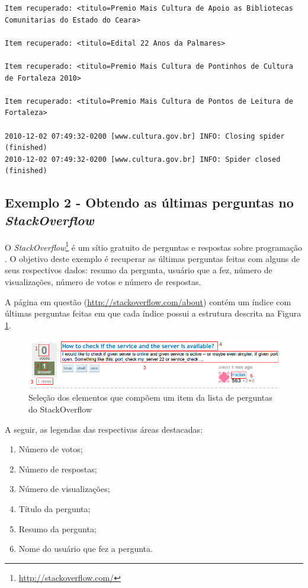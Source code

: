 \begin{lstlisting}[label=scrapy_wpt_minc]
Item recuperado: <titulo=Premio Mais Cultura de Apoio as Bibliotecas Comunitarias do Estado do Ceara> 

Item recuperado: <titulo=Edital 22 Anos da Palmares> 

Item recuperado: <titulo=Premio Mais Cultura de Pontinhos de Cultura de Fortaleza 2010> 

Item recuperado: <titulo=Premio Mais Cultura de Pontos de Leitura de Fortaleza> 

2010-12-02 07:49:32-0200 [www.cultura.gov.br] INFO: Closing spider (finished)
2010-12-02 07:49:32-0200 [www.cultura.gov.br] INFO: Spider closed (finished)
\end{lstlisting}


\subsection{Exemplo 2 - Obtendo as últimas perguntas no \textit{StackOverflow}}

O \textit{StackOverflow}\footnote{\url{http://stackoverflow.com/}} é um sítio gratuito de perguntas e respostas sobre programação \cite{stackoverflow}. O objetivo deste exemplo é recuperar as últimas perguntas feitas com alguns de seus respectivos dados: resumo da pergunta, usuário que a fez, número de visualizações, número de votos e número de respostas.

A página em questão (\url{http://stackoverflow.com/about}) contém um índice com últimas perguntas feitas em que cada índice possui a estrutura descrita na Figura \ref{stackoverflow}.

\begin{figure} [ht]
	\centering
	\includegraphics[scale=0.8]{stackoverflow.png}
	\caption{Seleção dos elementos que compõem um item da lista de perguntas do StackOverflow}
	\label{stackoverflow}
\end{figure}

A seguir, as legendas das respectivas áreas destacadas:

\begin{enumerate}
	\item Número de votos;
	\item Número de respostas;
	\item Número de visualizações;
	\item Título da pergunta;
	\item Resumo da pergunta;
	\item Nome do usuário que fez a pergunta.
\end{enumerate}

